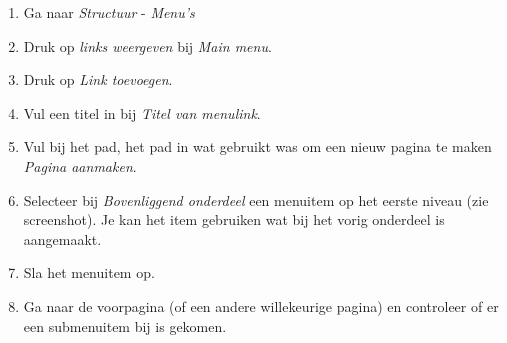 \begin{enumerate}
\item Ga naar \emph{Structuur} - \emph{Menu's}
\begin{center}
\end{center}
\item Druk op \emph{links weergeven} bij \emph{Main menu}.
\item Druk op \emph{Link toevoegen}.
\item Vul een titel in bij \emph{Titel van menulink}.
\item Vul bij het pad, het pad in wat gebruikt was om een nieuw pagina te maken \emph{Pagina aanmaken}.
\item Selecteer bij \emph{Bovenliggend onderdeel} een menuitem op het eerste niveau (zie screenshot). Je kan het item gebruiken wat bij het vorig onderdeel is aangemaakt.
\begin{center}
\end{center}
\item Sla het menuitem op.
\item Ga naar de voorpagina (of een andere willekeurige pagina) en controleer of er een submenuitem bij is gekomen.
\end{enumerate}

